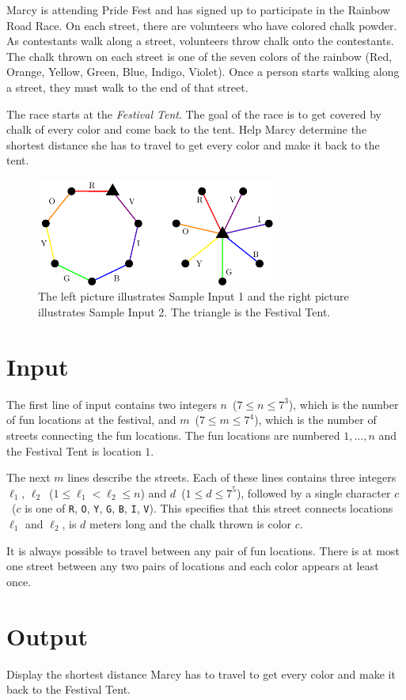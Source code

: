
Marcy is attending Pride Fest and has signed up to participate in the
Rainbow Road Race. On each street, there are volunteers who have
colored chalk powder. As contestants walk along a street, volunteers
throw chalk onto the contestants. The chalk thrown on each street is one of
the seven colors of the rainbow (Red, Orange, Yellow, Green, Blue,
Indigo, Violet).  Once a person starts walking along a street, they
must walk to the end of that street.

The race starts at the \textit{Festival Tent}. The goal of the race is 
to get covered by chalk of every color and come back to the tent. Help 
Marcy determine the shortest distance she has to travel to get every 
color and make it back to the tent.

\begin{figure}[h]
\begin{center}
 \includegraphics[width=0.7\textwidth]{rrr.pdf}
 \caption{The left picture illustrates Sample Input 1 and the right picture illustrates Sample Input 2. The triangle is the Festival Tent.}
\end{center}
\end{figure}

\section*{Input}

The first line of input contains two integers $n$~($7 \leq n \leq 7^3$), 
which is the number of fun locations at the festival, and $m$~($7 \leq m 
\leq 7^4$), which is the number of streets connecting the fun 
locations. The fun locations are numbered $1, \dots , n$ and the 
Festival Tent is location $1$.

The next $m$ lines describe the streets. Each of these lines contains 
three integers $\ell_1$, $\ell_2$~($1 \leq \ell_1 < \ell_2 \leq n$) and 
$d$~($1 \leq d \leq 7^5$), followed by a single character 
$c$~($c$ is one of \texttt{R}, \texttt{O}, \texttt{Y}, \texttt{G}, 
\texttt{B}, \texttt{I}, \texttt{V}). This specifies that this street 
connects locations $\ell_1$ and $\ell_2$, is $d$ meters long and the 
chalk thrown is color $c$.

It is always possible to travel between any pair of fun locations. There 
is at most one street between any two pairs of locations and each color 
appears at least once.


\section*{Output}

Display the shortest distance Marcy has to travel to get every color 
and make it back to the Festival Tent.


